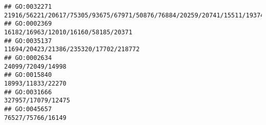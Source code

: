 \documentclass[
]{article}
\begin{document}
\begin{verbatim}
## GO:0032271                                                                                                                                                                                                                                                                                                                        21916/56221/20617/75305/93675/67971/50876/76884/20259/20741/15511/193740/22153/225288
## GO:0002369                                                                                                                                                                                                                                                                                                                                                                          16182/16963/12010/16160/58185/20371
## GO:0035137                                                                                                                                                                                                                                                                                                                                                                        11694/20423/21386/235320/17702/218772
## GO:0002634                                                                                                                                                                                                                                                                                                                                                                                            24099/72049/14998
## GO:0015840                                                                                                                                                                                                                                                                                                                                                                                            18993/11833/22270
## GO:0031666                                                                                                                                                                                                                                                                                                                                                                                           327957/17079/12475
## GO:0045657                                                                                                                                                                                                                                                                                                                                                                                            76527/75766/16149

\end{verbatim}
\end{document}
